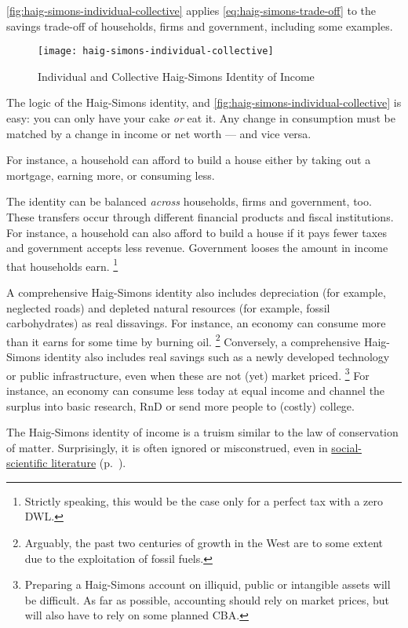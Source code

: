 \autoref{fig:haig-simons-individual-collective} applies \autoref{eq:haig-simons-trade-off} to the savings trade-off of households, firms and government, including some examples.

\begin{figure}[htbp]
	\centering
	\texttt{[image: haig-simons-individual-collective]}
	\caption{Individual and Collective Haig-Simons Identity of Income}
	\label{fig:haig-simons-individual-collective} %
\end{figure}

The logic of the Haig-Simons identity, and \autoref{fig:haig-simons-individual-collective} is easy:
you can only have your cake \emph{or} eat it.
Any change in consumption must be matched by a change in income or net worth --- and vice versa.

For instance, a household can afford to build a house either by taking out a mortgage, earning more, or consuming less.

The identity can be balanced \emph{across} households, firms and government, too.
These transfers occur through different financial products and fiscal institutions.
For instance, a household can also afford to build a house if it pays fewer taxes and government accepts less revenue.
Government looses the amount in income that households earn.
\footnote{
	Strictly speaking, this would be the case only for a perfect tax with a zero \gls{DWL}.
}

A comprehensive Haig-Simons identity also includes depreciation (for example, neglected roads) and depleted natural resources (for example, fossil carbohydrates) as real dissavings.
For instance, an economy can consume more than it earns for some time by burning oil.
\footnote{
	Arguably, the past two centuries of growth in the West are to some extent due to the exploitation of fossil fuels.
}
Conversely, a comprehensive Haig-Simons identity also includes real savings such as a newly developed technology or public infrastructure, even when these are not (yet) market priced.
\footnote{
	Preparing a Haig-Simons account on illiquid, public or intangible assets will be difficult.
	As far as possible, accounting should rely on market prices, but will also have to rely on  some planned \gls{CBA}.
}
For instance, an economy can consume less today at equal income and channel the surplus into basic research, \gls{RnD} or send more people to (costly) college.

The Haig-Simons identity of income is a truism similar to the law of conservation of matter.
Surprisingly, it is often ignored or misconstrued, even in \hyperref[sec:Literature]{social-scientific literature} (p.~\pageref{sec:Literature}).

